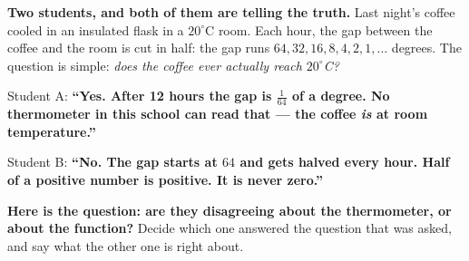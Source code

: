 \documentclass[10pt]{article}
\begin{document}
\boxguard[12]
\begin{hookbox}
\small
\textbf{Two students, and both of them are telling the truth.} Last night's coffee cooled in an
insulated flask in a $20^\circ$C room. Each hour, the gap between the coffee and the room is cut in
half: the gap runs $64, 32, 16, 8, 4, 2, 1, \dots$ degrees. The question is simple:
\emph{does the coffee ever actually reach $20^\circ$C?}

\smallskip
Student A: \textbf{``Yes. After 12 hours the gap is $\tfrac{1}{64}$ of a degree. No thermometer in
this school can read that --- the coffee \emph{is} at room temperature.''}

\smallskip
Student B: \textbf{``No. The gap starts at $64$ and gets halved every hour. Half of a positive number
is positive. It is never zero.''}

\smallskip
\textbf{Here is the question: are they disagreeing about the thermometer, or about the function?}
Decide which one answered the question that was asked, and say what the other one is right about.

\end{hookbox}

\vspace{0.10in}
\end{document}
